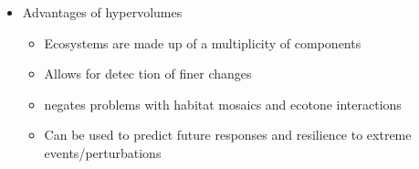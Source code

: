 \begin{itemize}
	\item Advantages of hypervolumes
	\begin{itemize}
		\item Ecosystems are made up of a multiplicity of components
		\item Allows for detec tion of finer changes
		\item negates problems with habitat mosaics and ecotone interactions
		\item Can be used to predict future responses and resilience to extreme events/perturbations
	\end{itemize}
\end{itemize}